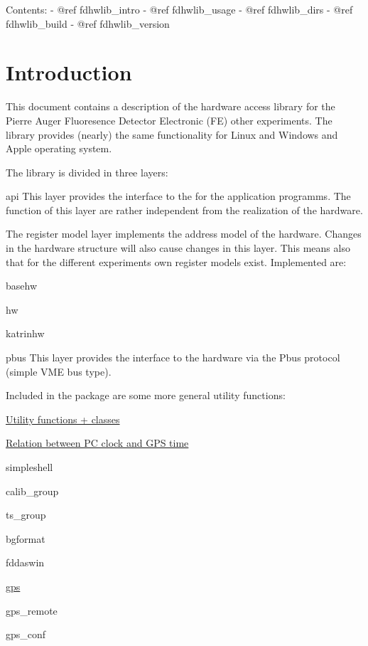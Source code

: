 \begin{DoxyVerb}Contents:
- @ref fdhwlib_intro
- @ref fdhwlib_usage
- @ref fdhwlib_dirs
- @ref fdhwlib_build
- @ref fdhwlib_version
\end{DoxyVerb}
\hypertarget{index_fdhwlib_intro}{}\section{Introduction}\label{index_fdhwlib_intro}
This document contains a description of the hardware access library for the Pierre Auger Fluoresence Detector Electronic (F\-E) other experiments. The library provides (nearly) the same functionality for Linux and Windows and Apple operating system.

The library is divided in three layers\-:
\begin{DoxyItemize}
\item api This layer provides the interface to the for the application programms. The function of this layer are rather independent from the realization of the hardware.
\item The register model layer implements the address model of the hardware. Changes in the hardware structure will also cause changes in this layer. This means also that for the different experiments own register models exist. Implemented are\-:
\begin{DoxyItemize}
\item basehw
\item hw
\item katrinhw
\end{DoxyItemize}
\item pbus This layer provides the interface to the hardware via the Pbus protocol (simple V\-M\-E bus type).
\end{DoxyItemize}

Included in the package are some more general utility functions\-:
\begin{DoxyItemize}
\item \hyperlink{group__akutil__group}{Utility functions + classes}
\begin{DoxyItemize}
\item \hyperlink{timesync}{Relation between P\-C clock and G\-P\-S time}
\end{DoxyItemize}
\item simpleshell
\item calib\-\_\-group
\item ts\-\_\-group
\begin{DoxyItemize}
\item bgformat
\item fddaswin
\end{DoxyItemize}
\item \hyperlink{classgps}{gps}
\begin{DoxyItemize}
\item gps\-\_\-remote
\item gps\-\_\-conf
\end{DoxyItemize}
\end{DoxyItemize}

